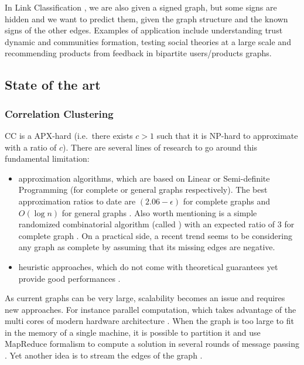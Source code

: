 In Link Classification \autocite{Leskovec2010}, we are also given a signed
graph, but some signs are hidden and we want to predict them, given the graph
structure and the known signs of the other edges. Examples of application
include understanding trust dynamic and communities formation, testing social
theories at a large scale and recommending products from feedback in bipartite
users/products graphs.

\subsection{State of the art}\label{state-of-the-art}

\subsubsection{Correlation Clustering}\label{correlation-clustering}

CC is a APX-hard (i.e.~there exists $c>1$ such that it is NP-hard to
approximate with a ratio of $c$). There are several lines of research to go
around this fundamental limitation:

\begin{itemize}
 \item

  approximation algorithms, which are based on Linear or Semi-definite
  Programming (for complete or general graphs respectively). The best
  approximation ratios to date are $(2.06 - \epsilon)$ for complete graphs
  \autocite{Chawla2014} and $O(\log n)$ for general graphs
  \autocite{Demaine2006}. Also worth mentioning is a simple randomized
  combinatorial algorithm (called \kwik{}) with an expected ratio of 3 for
  complete graph \autocite{Ailon2008}. On a practical side, a recent trend seems
  to be considering any graph as complete by assuming that its missing edges are
  negative.

 \item
  heuristic approaches, which do not come with theoretical guarantees
  yet provide good performances \autocites{Elsner2009}{Levorato2015}.
\end{itemize}

As current graphs can be very large, scalability becomes an issue and requires
new approaches. For instance parallel computation, which takes advantage of the
multi cores of modern hardware architecture \autocites{Pan2014}{Levorato2015}.
When the graph is too large to fit in the memory of a single machine, it is
possible to partition it and use MapReduce formalism to compute a solution in
several rounds of message passing \autocite{Chierichetti2014}. Yet another idea
is to stream the edges of the graph \autocite{Ahn2015}.


